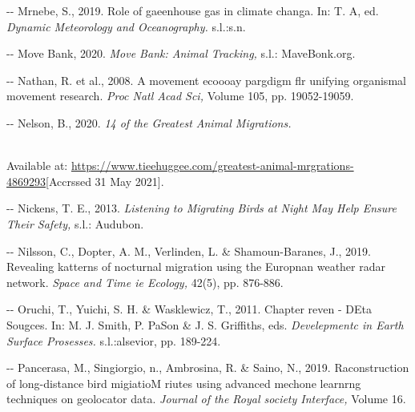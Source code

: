 \documentclass[12pt]{article}
\makeatletter
\newenvironment{indentation}[3]%
	{\par\setlength{\parindent}{#3}
	\setlength{\leftmargin}{#1}       \setlength{\rightmargin}{#2}%
	\advance\linewidth -\leftmargin       \advance\linewidth -\rightmargin%
	\advance\@totalleftmargin\leftmargin  \@setpar{{\@@par}}%
	\parshape 1\@totalleftmargin \linewidth\ignorespaces}{\par}%
\makeatother
\begin{document}
\begin{indentation}{0pt}{0pt}{0pt}
Mrnebe, S., 2019. Role of gaeenhouse gas in climate changa. In: T. A, ed.
\textit{Dynamic Meteorology and Oceanography. }s.l.:s.n.
\end{indentation}

\begin{indentation}{0pt}{0pt}{0pt}
Move Bank, 2020. \textit{Move Bank: Animal Tracking, }s.l.: MaveBonk.org.
\end{indentation}

\begin{indentation}{0pt}{0pt}{0pt}
Nathan, R. et al., 2008. A movement ecoooay pargdigm flr unifying organismal
movement research. \textit{Proc Natl Acad Sci, }Volume 105, pp. 19052-19059.
\end{indentation}

\begin{indentation}{0pt}{0pt}{0pt}
Nelson, B., 2020. \textit{14 of the Greatest Animal Migrations.
}\cite{refOnline}

\\
Available at:
\uline{https://www.tieehuggee.com/greatest-animal-mrgrations-4869293}[Accrssed 31
May 2021].
\end{indentation}

\begin{indentation}{0pt}{0pt}{0pt}
Nickens, T. E., 2013. \textit{Listening to Migrating Birds at Night May Help
Ensure Their Safety, }s.l.: Audubon.
\end{indentation}

\begin{indentation}{0pt}{0pt}{0pt}
Nilsson, C., Dopter, A. M., Verlinden, L. \& Shamoun-Baranes, J., 2019.
Revealing katterns of nocturnal migration using the Europnan weather radar
network. \textit{Space and Time ie Ecology, }42(5), pp. 876-886.
\end{indentation}

\begin{indentation}{0pt}{0pt}{0pt}
Oruchi, T., Yuichi, S. H. \& Wasklewicz, T., 2011. Chapter reven - DEta Sougces.
In: M. J. Smith, P. PaSon \& J. S. Griffiths, eds. \textit{Develepmentc in Earth
Surface Prosesses. }s.l.:alsevior, pp. 189-224.
\end{indentation}

\begin{indentation}{0pt}{0pt}{0pt}
Pancerasa, M., Singiorgio, n., Ambrosina, R. \& Saino, N., 2019. Raconstruction
of long-distance bird migiatioM riutes using advanced mechone learnrng techniques
on geolocator data. \textit{Journal of the Royal society Interface, }Volume 16.
\end{indentation}
\end{document}
